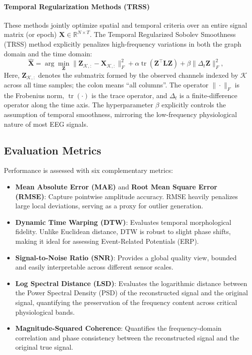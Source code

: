 \paragraph{Temporal Regularization Methods (TRSS)} 
These methods jointly optimize spatial and temporal criteria over an entire signal matrix (or epoch) $\mathbf{X} \in \mathbb{R}^{N \times T}$. The Temporal Regularized Sobolev Smoothness (TRSS) method \cite{giraldo2022} explicitly penalizes high-frequency variations in both the graph domain and the time domain:
\begin{equation}
  \hat{\mathbf{X}} = \arg\min_{\mathbf{Z}}
    \|\mathbf{Z}_{\mathcal{K}, :} - \mathbf{X}_{\mathcal{K}, :}\|_F^2
    + \alpha \operatorname{tr}(\mathbf{Z}^\top \mathbf{L} \mathbf{Z})
    + \beta \|\Delta_t \mathbf{Z}\|_F^2,
  \label{eq:sobolev}
\end{equation}
Here, $\mathbf{Z}_{\mathcal{K}, :}$ denotes the submatrix formed by the observed channels indexed by $\mathcal{K}$ across all time samples; the colon means ``all columns''. The operator $\|\cdot\|_F$ is the Frobenius norm, $\operatorname{tr}(\cdot)$ is the trace operator, and $\Delta_t$ is a finite-difference operator along the time axis. The hyperparameter $\beta$ explicitly controls the assumption of temporal smoothness, mirroring the low-frequency physiological nature of most EEG signals.

\subsection{Evaluation Metrics}

Performance is assessed with six complementary metrics:
\begin{itemize}
\item \textbf{Mean Absolute Error (MAE)} and \textbf{Root Mean Square Error (RMSE)}: Capture pointwise amplitude accuracy. RMSE heavily penalizes large local deviations, serving as a proxy for outlier generation.
\item \textbf{Dynamic Time Warping (DTW)}: Evaluates temporal morphological fidelity. Unlike Euclidean distance, DTW is robust to slight phase shifts, making it ideal for assessing Event-Related Potentials (ERP).
\item \textbf{Signal-to-Noise Ratio (SNR)}: Provides a global quality view, bounded and easily interpretable across different sensor scales.
\item \textbf{Log Spectral Distance (LSD)}: Evaluates the logarithmic distance between the Power Spectral Density (PSD) of the reconstructed signal and the original signal, quantifying the preservation of the frequency content across critical physiological bands.
\item \textbf{Magnitude-Squared Coherence}: Quantifies the frequency-domain correlation and phase consistency between the reconstructed signal and the original true signal.
\end{itemize}

